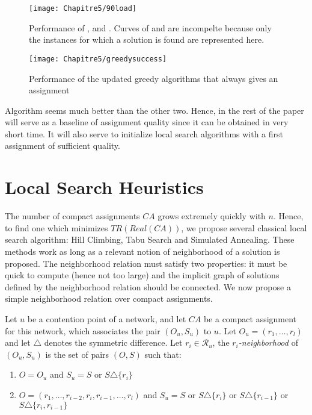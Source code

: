  	\begin{figure}
	\centering
	\texttt{[image: Chapitre5/90load]}
\caption{Performance of \greedydeadline, \greedynormalized and \greedypacked. Curves of \greedydeadline and \greedynormalized are incompelte because only the instances for which a solution is found are represented here.}
\label{fig:90load}
\end{figure}


\begin{figure}
	\centering
	\texttt{[image: Chapitre5/greedysuccess]}
\caption{Performance of the updated greedy algorithms that always gives an assignment} 
\label{fig:greedysuccess}
\end{figure}

Algorithm \hybridgreedynormalized seems much better than the other two. Hence, in the rest of the paper \hybridgreedynormalized will serve as a baseline of assignment quality since it can be obtained in very short time. It will also serve to initialize 
local search algorithms with a first assignment of sufficient quality.

\section{Local Search Heuristics}

The number of compact assignments $CA$ grows extremely quickly with $n$. Hence, to find one which minimizes $TR(Real(CA))$, we propose several classical local search algorithm: Hill Climbing, Tabu Search and Simulated Annealing. These methods work as long as a relevant notion of neighborhood of a solution is proposed. The neighborhood relation must satisfy two properties: it must be quick to compute (hence not too large) and the implicit graph of solutions defined
by the neighborhood relation should be connected. We now propose a simple neighborhood relation over compact assignments.

Let $u$ be a contention point of a network, and let $CA$ be a compact assignment for this network, 
 which associates the pair $(O_u,S_u)$ to $u$. Let $O_u = (r_1,\dots,r_l)$ and let $\triangle$ denotes the symmetric difference.   Let $r_i \in \mathcal{R}_u$, the \emph{$r_i$-neighborhood} of $(O_u,S_u)$ is the set of pairs $(O,S)$ such that:
 
 \begin{enumerate} 
 \item $O = O_u$ and $S_u = S$ or $S \triangle \{r_i\}$  
 \item $O = (r_1,\dots,r_{i-2},r_{i},r_{i-1},\dots,r_{l})$ and $S_u = S$ or $S \triangle \{r_i\}$ or  $S \triangle \{r_{i-1}\}$ or $S \triangle \{r_i,r_{i-1}\}$ 
 \end{enumerate}


